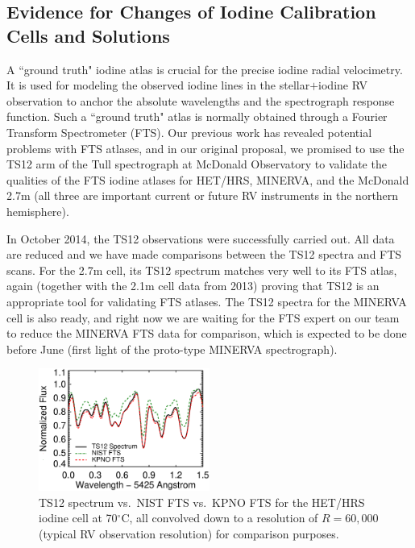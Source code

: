 \documentclass[12pt]{article}
\def\degree{^{\circ}}
\begin{document}
\vspace{-10pt}
\subsection{Evidence for Changes of Iodine Calibration Cells and Solutions}\label{sec:fts}
\vspace{-5pt}

A ``ground truth" iodine atlas is crucial for the precise iodine
radial velocimetry. It is used for modeling the observed iodine lines
in the stellar$+$iodine RV observation to anchor the absolute
wavelengths and the spectrograph response function. Such a ``ground
truth" atlas is normally obtained through a Fourier Transform
Spectrometer (FTS). Our previous work has revealed potential problems
with FTS atlases, and in our original proposal, we promised to use the
TS12 arm of the Tull spectrograph at McDonald Observatory to validate
the qualities of the FTS iodine atlases for HET/HRS, MINERVA, and the
McDonald 2.7m (all three are important current or future RV
instruments in the northern hemisphere).

In October 2014, the TS12 observations were successfully carried
out. All data are reduced and we have made comparisons between the
TS12 spectra and FTS scans. For the 2.7m cell, its TS12 spectrum
matches very well to its FTS atlas, again (together with the 2.1m cell
data from 2013) proving that TS12 is an appropriate tool for
validating FTS atlases. The TS12 spectra for the MINERVA cell is also
ready, and right now we are waiting for the FTS expert on our team to
reduce the MINERVA FTS data for comparison, which is expected to be
done before June (first light of the proto-type MINERVA spectrograph).

\begin{figure}
  \vspace{-35pt}
  \begin{center}
    \includegraphics[width=0.5\textwidth]{het70_comp}
  \end{center}
  \vspace{-25pt}  
  \caption{TS12 spectrum vs.\ NIST FTS vs.\ KPNO FTS for the HET/HRS
    iodine cell at 70$\degree$C, all convolved down to a resolution of
    $R=60,000$ (typical RV observation resolution) for comparison
    purposes.}
  \vspace{-8pt}  
  \label{fig:fts}
\end{figure}
\end{document}

